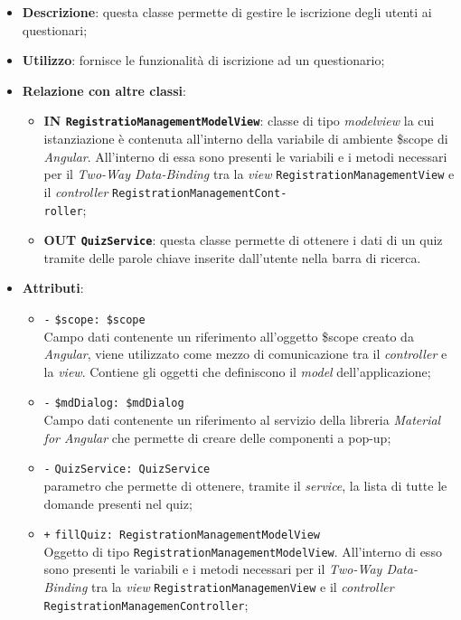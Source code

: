 \begin{itemize}
	\item \textbf{Descrizione}: questa classe permette di gestire le iscrizione degli utenti ai questionari;
	\item \textbf{Utilizzo}: fornisce le funzionalità di iscrizione ad un questionario;
	\item \textbf{Relazione con altre classi}:
	\begin{itemize}
		\item \textbf{IN \texttt{RegistratioManagementModelView}}: classe di tipo \textit{modelview} la cui istanziazione è contenuta all'interno della variabile di ambiente \$scope di \textit{Angular}. All'interno di essa sono presenti le variabili e i metodi necessari per il \textit{Two-Way Data-Binding} tra la \textit{view} \texttt{RegistrationManagementView} e il \textit{controller} \texttt{RegistrationManagementCont-\\roller}; 
		\item \textbf{OUT \texttt{QuizService}}: questa classe permette di ottenere i dati di un quiz tramite delle parole chiave inserite dall'utente nella barra di ricerca.
	\end{itemize}
	\item \textbf{Attributi}:
	\begin{itemize}
		\item \texttt{-} \texttt{\$scope: \$scope} \\
		Campo dati contenente un riferimento all'oggetto \$scope creato da \textit{Angular}, viene utilizzato come mezzo di comunicazione tra il \textit{controller} e la \textit{view}. Contiene gli oggetti che definiscono il \textit{model} dell'applicazione;
		\item \texttt{-} \texttt{\$mdDialog: \$mdDialog} \\
		Campo dati contenente un riferimento al servizio della libreria \textit{Material for Angular} che permette di creare delle componenti a pop-up;
		\item \texttt{-} \texttt{QuizService: QuizService}\\ parametro che permette di ottenere, tramite il \textit{service}, la lista di tutte le domande presenti nel quiz;
		\item \texttt{+} \texttt{fillQuiz: RegistrationManagementModelView} \\
		Oggetto di tipo \texttt{RegistrationManagementModelView}. All'interno di esso sono presenti le variabili e i metodi necessari per il \textit{Two-Way Data-Binding} tra la \textit{view} \texttt{RegistrationManagemenView} e il \textit{controller} \texttt{RegistrationManagemenController};

\end{itemize}
\end{itemize}
